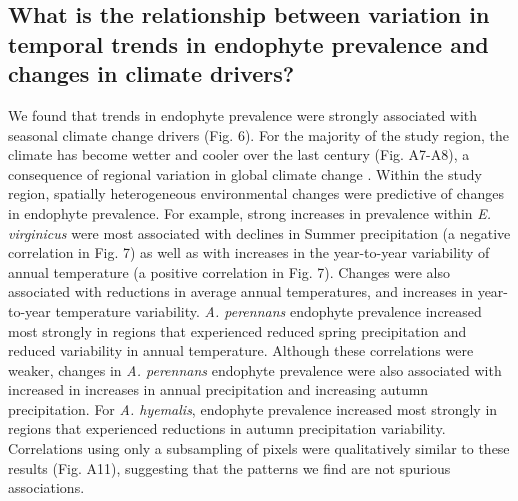 \documentclass[11pt]{article}
\let\cite\citep
\begin{document}
\subsection*{What is the relationship between variation in temporal trends in endophyte prevalence and changes in climate drivers?}

We found that trends in endophyte prevalence were strongly associated with seasonal climate change drivers (Fig. 6).
For the majority of the study region, the climate has become wetter and cooler over the last century (Fig. A7-A8), a consequence of regional variation in global climate change \cite{ipcc_2021}. 
Within the study region, spatially heterogeneous environmental changes were predictive of changes in endophyte prevalence. 
For example, strong increases in prevalence within \emph{E. virginicus} were most associated with declines in Summer precipitation  (a negative correlation in Fig. 7) as well as with increases in the year-to-year variability of annual temperature (a positive correlation in Fig. 7). 
Changes were also associated with reductions in average annual temperatures, and increases in year-to-year temperature variability.
\emph{A. perennans} endophyte prevalence increased most strongly in regions that experienced reduced spring precipitation and reduced variability in annual temperature.
Although these correlations were weaker, changes in \emph{A. perennans} endophyte prevalence were also associated with increased in increases in annual precipitation and increasing autumn precipitation. 
For \emph{A. hyemalis}, endophyte prevalence increased most strongly in regions that experienced reductions in autumn precipitation variability. 
Correlations using only a subsampling of pixels were qualitatively similar to these results (Fig. A11), suggesting that the patterns we find are not spurious associations.
\end{document}
